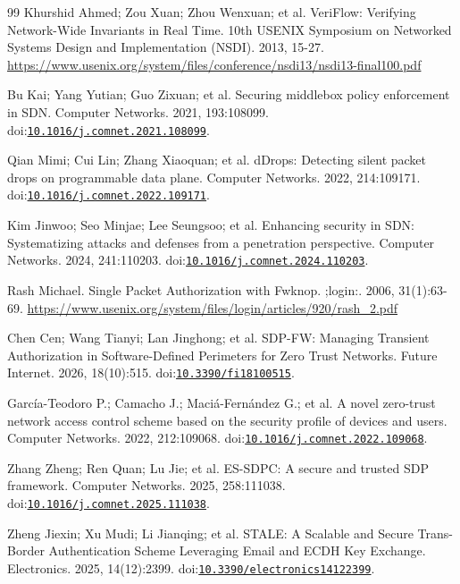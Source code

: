 \begin{thebibliography}{99}
Khurshid Ahmed; Zou Xuan; Zhou Wenxuan; et al. VeriFlow: Verifying Network-Wide Invariants in Real Time. 10th USENIX Symposium on Networked Systems Design and Implementation (NSDI). 2013, 15-27. \url{https://www.usenix.org/system/files/conference/nsdi13/nsdi13-final100.pdf}

Bu Kai; Yang Yutian; Guo Zixuan; et al. Securing middlebox policy enforcement in SDN. Computer Networks. 2021, 193:108099. doi:\href{https://doi.org/10.1016/j.comnet.2021.108099}{\nolinkurl{10.1016/j.comnet.2021.108099}}.

Qian Mimi; Cui Lin; Zhang Xiaoquan; et al. dDrops: Detecting silent packet drops on programmable data plane. Computer Networks. 2022, 214:109171. doi:\href{https://doi.org/10.1016/j.comnet.2022.109171}{\nolinkurl{10.1016/j.comnet.2022.109171}}.

Kim Jinwoo; Seo Minjae; Lee Seungsoo; et al. Enhancing security in SDN: Systematizing attacks and defenses from a penetration perspective. Computer Networks. 2024, 241:110203. doi:\href{https://doi.org/10.1016/j.comnet.2024.110203}{\nolinkurl{10.1016/j.comnet.2024.110203}}.

Rash Michael. Single Packet Authorization with Fwknop. ;login:. 2006, 31(1):63-69. \url{https://www.usenix.org/system/files/login/articles/920/rash_2.pdf}

Chen Cen; Wang Tianyi; Lan Jinghong; et al. SDP-FW: Managing Transient Authorization in Software-Defined Perimeters for Zero Trust Networks. Future Internet. 2026, 18(10):515. doi:\href{https://doi.org/10.3390/fi18100515}{\nolinkurl{10.3390/fi18100515}}.

García-Teodoro P.; Camacho J.; Maciá-Fernández G.; et al. A novel zero-trust network access control scheme based on the security profile of devices and users. Computer Networks. 2022, 212:109068. doi:\href{https://doi.org/10.1016/j.comnet.2022.109068}{\nolinkurl{10.1016/j.comnet.2022.109068}}.

Zhang Zheng; Ren Quan; Lu Jie; et al. ES-SDPC: A secure and trusted SDP framework. Computer Networks. 2025, 258:111038. doi:\href{https://doi.org/10.1016/j.comnet.2025.111038}{\nolinkurl{10.1016/j.comnet.2025.111038}}.

Zheng Jiexin; Xu Mudi; Li Jianqing; et al. STALE: A Scalable and Secure Trans-Border Authentication Scheme Leveraging Email and ECDH Key Exchange. Electronics. 2025, 14(12):2399. doi:\href{https://doi.org/10.3390/electronics14122399}{\nolinkurl{10.3390/electronics14122399}}.


\end{thebibliography}
